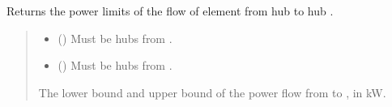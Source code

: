 \documentclass[letterpaper,10pt,english]{sphinxmanual}
\begin{document}
\begin{fulllineitems}
\begin{fulllineitems}
\begin{quote}
\begin{description}
\end{description}\end{quote}

\end{fulllineitems}


\begin{fulllineitems}
\label{\detokenize{generated/tamos.network.NonThermalNetwork:tamos.network.NonThermalNetwork.get_connection_power_bounds}}
\pysigstartsignatures
{}
\pysigstopsignatures
\sphinxAtStartPar
Returns the power limits of the flow of element from hub  to hub .
\begin{quote}\begin{description}
\begin{itemize}
\item {} 
\sphinxAtStartPar
{} ({\hyperref[\detokenize{generated/tamos.Hub:tamos.Hub}]{}}) \textendash{} Must be hubs from .

\item {} 
\sphinxAtStartPar
{} ({\hyperref[\detokenize{generated/tamos.Hub:tamos.Hub}]{}}) \textendash{} Must be hubs from .

\end{itemize}

\sphinxAtStartPar
The lower bound and upper bound of the power flow from  to , in kW.

\end{description}\end{quote}

\end{fulllineitems}



\end{fulllineitems}
\end{document}
